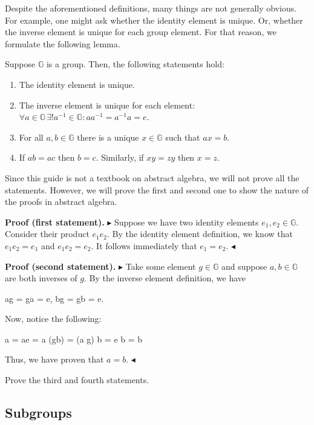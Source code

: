 \documentclass[../lecture-notes-148x210.tex]{subfiles}
\begin{document}
Despite the aforementioned definitions, many things are not generally obvious. For example, one might ask whether the identity element is unique. Or, 
whether the inverse element is unique for each group element. For that reason, we formulate the following lemma.

\begin{lemma}
    Suppose $\mathbb{G}$ is a group. Then, the following statements hold:
    \begin{enumerate}
        \item The identity element is unique.
        \item The inverse element is unique for each element: $\forall a \in \mathbb{G} \, \exists! a^{-1} \in \mathbb{G}: aa^{-1} = a^{-1}a = e$.
        \item For all $a,b \in \mathbb{G}$ there is a unique $x \in \mathbb{G}$ such that $ax = b$.
        \item If $ab=ac$ then $b=c$. Similarly, if $xy=zy$ then $x=z$.
    \end{enumerate}
\end{lemma}

Since this guide is not a textbook on abstract algebra, we will not prove all the statements. However, we will prove the first and second one to show the nature of the proofs in abstract algebra.

\textbf{Proof (first statement).}
$\blacktriangleright$ Suppose we have two identity elements $e_1, e_2 \in
\mathbb{G}$. Consider their product $e_1e_2$. By the identity element
definition, we know that $e_1e_2 = e_1$ and $e_1e_2 = e_2$. It follows
immediately that $e_1=e_2$. $\blacktriangleleft$

\textbf{Proof (second statement).} 
$\blacktriangleright$ 
Take some element $g \in \mathbb{G}$ and suppose $a, b \in \mathbb{G}$ are both inverses of $g$. 
By the inverse element definition, we have
\begin{xequation}
    ag = ga = e, \quad bg = gb = e.
\end{xequation}
Now, notice the following:
\begin{xequation}
    a = ae = a (gb) = (a g) b = e b = b
\end{xequation}
Thus, we have proven that $a = b$.
$\blacktriangleleft$

\begin{exercise}
    Prove the third and fourth statements.
\end{exercise}

\subsection{Subgroups}
\end{document}

